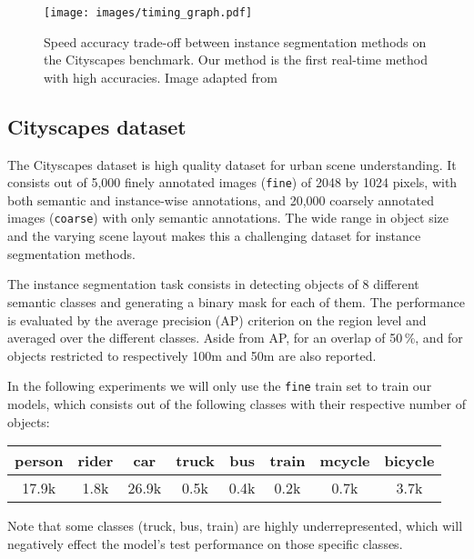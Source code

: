 \begin{figure}
    \begin{center}
    	\texttt{[image: images/timing\_graph.pdf]}
    \end{center}
    \caption{Speed accuracy trade-off between instance segmentation methods on the Cityscapes benchmark. Our method is the first real-time method with high accuracies. Image adapted from ~\cite{uhrig2018box2pix}}
    \label{fig:timing_results}
\end{figure}

\subsection{Cityscapes dataset}
The Cityscapes dataset is high quality dataset for urban scene understanding. It consists out of 5,000 finely annotated images (\texttt{fine}) of 2048 by 1024 pixels, with both semantic and instance-wise annotations, and 20,000 coarsely annotated images (\texttt{coarse}) with only semantic annotations. The wide range in object size and the varying scene layout makes this a challenging dataset for instance segmentation methods. 

The instance segmentation task consists in detecting objects of 8 different semantic classes and generating a binary mask for each of them. The performance is evaluated by the average precision (AP) criterion on the region level and averaged over the different classes. Aside from AP,  for an overlap of 50\,\%,  and  for objects restricted to respectively 100m and 50m are also reported. 

In the following experiments we will only use the \texttt{fine} train set to train our models, which consists out of the following classes with their respective number of objects:

\vspace{3mm}

\begin{centering}
    \footnotesize
    \centering
    \begin{tabular}{c|c|c|c|c|c|c|c}
         person & rider & car & truck & bus & train & mcycle & bicycle \\
         \hline 
         17.9k & 1.8k & 26.9k & 0.5k & 0.4k & 0.2k & 0.7k & 3.7k \\
    \end{tabular}
\end{centering}

Note that some classes (truck, bus, train) are highly underrepresented, which will negatively effect the model's test performance on those specific classes.

